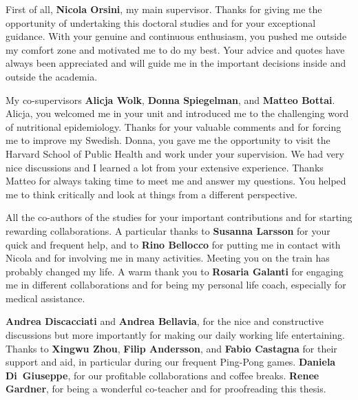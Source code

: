 \documentclass[11pt,a4paper,twoside,openany]{book}\usepackage{knitr}
\begin{document}
{{First of all, \textbf{Nicola Orsini}, my main supervisor. Thanks for giving me the opportunity of undertaking this doctoral studies and for your exceptional guidance. With your genuine and continuous enthusiasm, you pushed me outside my comfort zone and motivated me to do my best. Your advice and quotes have always been  appreciated and will guide me in the important decisions inside and outside the academia. 
\medskip

My co-supervisors \textbf{Alicja Wolk}, \textbf{Donna Spiegelman}, and \textbf{Matteo Bottai}. Alicja, you welcomed me in your unit and introduced me to the challenging word of nutritional epidemiology. Thanks for your valuable comments and for forcing me to improve my Swedish. Donna, you gave me the opportunity to visit the Harvard School of Public Health and work under your supervision. We had very nice discussions and I learned a lot from your extensive experience. Thanks Matteo for always taking time to meet me and answer my questions. You helped me to think critically and look at things from a different perspective.

\medskip
All the co-authors of the studies for your important contributions and for starting rewarding collaborations. A particular thanks to \textbf{Susanna Larsson} for your quick and frequent help, and to \textbf{Rino Bellocco} for putting me in contact with Nicola and for involving me in many activities. Meeting you on the train has probably changed my life. A warm thank you to \textbf{Rosaria Galanti} for engaging me in different collaborations and for being my personal life coach, especially for medical assistance.
\medskip

\textbf{Andrea Discacciati} and \textbf{Andrea Bellavia}, for the nice and constructive discussions but more importantly for making our daily working life entertaining. Thanks to \textbf{Xingwu Zhou}, \textbf{Filip Andersson}, and \textbf{Fabio Castagna} for their support and aid, in particular during our frequent Ping-Pong games. \textbf{Daniela Di~Giuseppe}, for our profitable collaborations and coffee breaks. \textbf{Renee Gardner}, for being a wonderful co-teacher and for proofreading this thesis.
\medskip

}}
\end{document}
